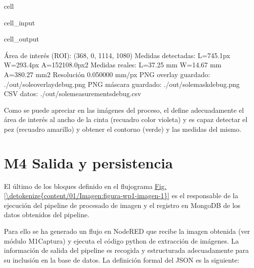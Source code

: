 \documentclass[a4paper,10pt,spanish]{jupyterBook}
\begin{document}
\begin{sphinxuseclass}{cell}
\begin{sphinxVerbatimInput}
\begin{sphinxuseclass}{cell_input}
\end{sphinxuseclass}\end{sphinxVerbatimInput}
\begin{sphinxVerbatimOutput}

\begin{sphinxuseclass}{cell_output}
\begin{sphinxVerbatim}[commandchars=\\\{\}]
Área de interés (ROI): (368, 0, 1114, 1080)
Medidas detectadas: L=745.1px  W=293.4px  A=152108.0px\PYGZca{}2
Medidas reales: L=37.25 mm  W=14.67 mm  A=380.27 mm\PYGZca{}2  Resolución 0.050000 mm/px
PNG overlay guardado: ./out/sole\PYGZus{}overlay\PYGZus{}debug.png
PNG máscara guardado: ./out/sole\PYGZus{}mask\PYGZus{}debug.png
CSV datos: ./out/sole\PYGZus{}measurements\PYGZus{}debug.csv
\end{sphinxVerbatim}

\noindent{}

\end{sphinxuseclass}\end{sphinxVerbatimOutput}

\end{sphinxuseclass}
\sphinxAtStartPar
Como se puede apreciar en las imágenes del proceso, el  define adecuadamente el área de interés al ancho de la cinta (recuadro color violeta) y es capaz detectar el pez (recuadro amarillo) y obtener el contorno (verde) y las medidas del mismo.

\sphinxstepscope


\section{M4 \sphinxhyphen{} Salida y persistencia}
\label{\detokenize{content/01/Modulo-4:m4-salida-y-persistencia}}\label{\detokenize{content/01/Modulo-4::doc}}
\sphinxAtStartPar
El último de los bloques definido en el flujograma \hyperref[\detokenize{content/01/Imagen:figura-wp1-imagen-1}]{Fig.\@ \ref{\detokenize{content/01/Imagen:figura-wp1-imagen-1}}} es el responsable de la ejecución del pipeline de procesado de imagen y el registro en MongoDB de los datos obtenidos del pipeline.

\sphinxAtStartPar
Para ello se ha generado un flujo en Node\sphinxhyphen{}RED que recibe la imagen obtenida (ver módulo M1\sphinxhyphen{}Captura) y ejecuta el código python de extracción de imágenes. La información de salida del pipeline es recogida y estructurada adecuadamente para su inclusión en la base de datos. La definición formal del JSON es la siguiente:
\end{document}
